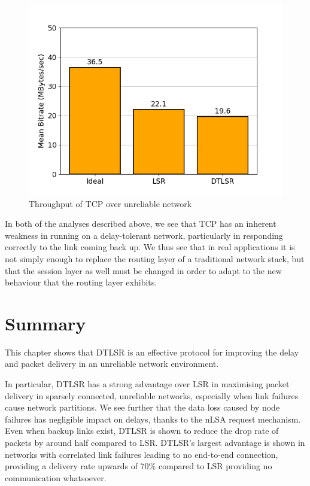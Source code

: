 \documentclass[withindex,glossary,openany]{cam-thesis}
\begin{document}
\begin{figure}[H]
  \centering
  \includegraphics[width=0.8\linewidth]{tcp_bar_flap5_30}
  \caption{Throughput of TCP over unreliable network}
  \label{fig:tcp_5_30}
\end{figure}

In both of the analyses described above, we see that TCP has an inherent weakness in running on a delay-tolerant network, particularly in responding correctly to the link coming back up. We thus see that in real applications it is not simply enough to replace the routing layer of a traditional network stack, but that the session layer as well must be changed in order to adapt to the new behaviour that the routing layer exhibits.


\section{Summary}

This chapter shows that DTLSR is an effective protocol for improving the delay and packet delivery in an unreliable network environment.

In particular, DTLSR has a strong advantage over LSR in maximising packet delivery in sparsely connected, unreliable networks, especially when link failures cause network partitions. We see further that the data loss caused by node failures has negligible impact on delays, thanks to the nLSA request mechanism. Even when backup links exist, DTLSR is shown to reduce the drop rate of packets by around half compared to LSR. DTLSR's largest advantage is shown in networks with correlated link failures leading to no end-to-end connection, providing a delivery rate upwards of 70\% compared to LSR providing no communication whatsoever.
\end{document}
